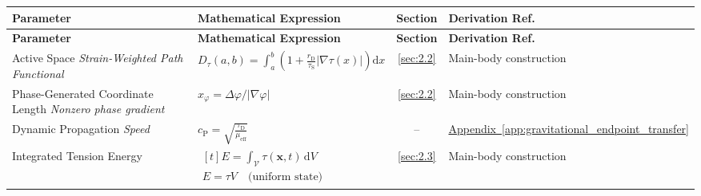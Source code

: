 \vspace{0.5cm}
\noindent
\begin{longtable}{@{} p{4.5cm} p{6cm} c p{4cm} @{}}
\toprule
\textbf{Parameter} & \textbf{Mathematical Expression} & \textbf{Section} & \textbf{Derivation Ref.} \\
\midrule
\endfirsthead
\toprule
\textbf{Parameter} & \textbf{Mathematical Expression} & \textbf{Section} & \textbf{Derivation Ref.} \\
\midrule
\endhead

{\raggedright Active Space \newline \textit{Strain-Weighted Path Functional}\par} & {\raggedright $D_\tau(a,b) = \int_a^b \left( 1 + \frac{r_{\mathrm{D}}}{\tau_{\mathrm{S}}} |\nabla\tau(x)| \right) \mathrm{d}x$\par} & \hyperref[sec:2.2]{\ref*{sec:2.2}} & {\raggedright Main-body construction\par} \\

{\raggedright Phase-Generated Coordinate Length \newline \textit{Nonzero phase gradient}\par} & {\raggedright $x_\varphi=\Delta\varphi/|\nabla\varphi|$\par} & \hyperref[sec:2.2]{\ref*{sec:2.2}} & {\raggedright Main-body construction\par} \\

{\raggedright Dynamic Propagation \newline \textit{Speed}\par} & {\raggedright $c_{\mathrm{P}} = \sqrt{\frac{\tau_{\mathrm{D}}}{\mu_{\mathrm{eff}}}}$\par} & -- & {\raggedright \hyperref[app:gravitational_endpoint_transfer]{Appendix~\ref*{app:gravitational_endpoint_transfer}}\par} \\

{\raggedright Integrated Tension Energy\par} & {\raggedright $\begin{gathered}[t]E=\int_{\mathcal V}\tau(\mathbf x,t)\,\mathrm dV \\ E=\tau V\quad\text{(uniform state)}\end{gathered}$\par} & \hyperref[sec:2.3]{\ref*{sec:2.3}} & {\raggedright Main-body construction\par} \\


\end{longtable}
